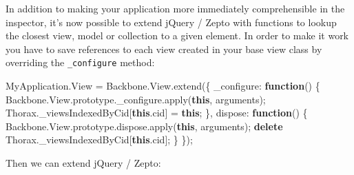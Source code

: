 \documentclass[9pt]{book}
\newenvironment{Shaded}{}{}
\newcommand{\KeywordTok}[1]{\textcolor[rgb]{0.00,0.44,0.13}{\textbf{{#1}}}}
\newcommand{\DataTypeTok}[1]{\textcolor[rgb]{0.56,0.13,0.00}{{#1}}}
\newcommand{\OtherTok}[1]{\textcolor[rgb]{0.00,0.44,0.13}{{#1}}}
\newcommand{\FunctionTok}[1]{\textcolor[rgb]{0.02,0.16,0.49}{{#1}}}
\newcommand{\NormalTok}[1]{{#1}}
\begin{document}
In addition to making your application more immediately comprehensible
in the inspector, it's now possible to extend jQuery / Zepto with
functions to lookup the closest view, model or collection to a given
element. In order to make it work you have to save references to each
view created in your base view class by overriding the
\texttt{\_configure} method:

\begin{Shaded}
\begin{Highlighting}[]
    \OtherTok{MyApplication}\NormalTok{.}\FunctionTok{View} \NormalTok{= }\OtherTok{Backbone}\NormalTok{.}\OtherTok{View}\NormalTok{.}\FunctionTok{extend}\NormalTok{(\{}
        \DataTypeTok{_configure}\NormalTok{: }\KeywordTok{function}\NormalTok{() \{}
            \OtherTok{Backbone}\NormalTok{.}\OtherTok{View}\NormalTok{.}\OtherTok{prototype}\NormalTok{.}\OtherTok{_configure}\NormalTok{.}\FunctionTok{apply}\NormalTok{(}\KeywordTok{this}\NormalTok{, arguments);}
            \OtherTok{Thorax}\NormalTok{.}\FunctionTok{_viewsIndexedByCid}\NormalTok{[}\KeywordTok{this}\NormalTok{.}\FunctionTok{cid}\NormalTok{] = }\KeywordTok{this}\NormalTok{;}
        \NormalTok{\},}
        \DataTypeTok{dispose}\NormalTok{: }\KeywordTok{function}\NormalTok{() \{}
            \OtherTok{Backbone}\NormalTok{.}\OtherTok{View}\NormalTok{.}\OtherTok{prototype}\NormalTok{.}\OtherTok{dispose}\NormalTok{.}\FunctionTok{apply}\NormalTok{(}\KeywordTok{this}\NormalTok{, arguments);}
            \KeywordTok{delete} \OtherTok{Thorax}\NormalTok{.}\FunctionTok{_viewsIndexedByCid}\NormalTok{[}\KeywordTok{this}\NormalTok{.}\FunctionTok{cid}\NormalTok{];}
        \NormalTok{\}}
    \NormalTok{\});}
\end{Highlighting}
\end{Shaded}

Then we can extend jQuery / Zepto:
\end{document}
